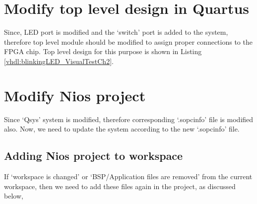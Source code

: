 \section{Modify top level design in Quartus}
Since, LED port is modified and the `switch' port is added to the system, therefore top level module should be modified to assign proper connections to the FPGA chip. Top level design for this purpose is shown in Listing \ref{vhdl:blinkingLED_VisualTestCh2}.


\section{Modify  Nios project}
Since `Qsys' system is modified, therefore corresponding `.sopcinfo' file is modified also. Now, we need to update the system according to the new `.sopcinfo' file. 

\subsection{Adding Nios project to workspace}
If `workspace is changed' or `BSP/Application files are removed' from the current workspace, then we need to add these files again in the project, as discussed below, 

